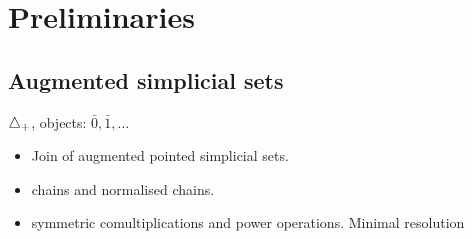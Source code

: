 
\section{Preliminaries} \label{s:preliminaries}

\subsection{Augmented simplicial sets}

$\triangle_+$, objects: $\bar{0}, \bar{1}, \dots$
\begin{itemize}
    \item Join of augmented pointed simplicial sets.
    \item chains and normalised chains.
    \item symmetric comultiplications and power operations. Minimal resolution
\end{itemize}
